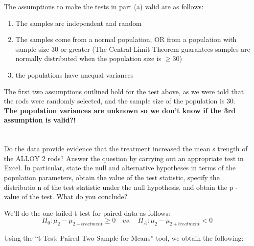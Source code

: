\documentclass[letterpaper]{article}
\begin{document}
The assumptions to make the tests in part (a) valid are as follows:
\begin{enumerate}
 \item The samples are independent and random
 \item The samples come from a normal population,
       OR from a population with sample size 30 or greater
       (The Central Limit Theorem guarantees samples are normally distributed
       when the population size is $\geq 30$)
 \item the populations have unequal variances
\end{enumerate}

The first two assumptions outlined hold for the test above, as we were told that the
rods were randomly selected, and the sample size of the population is 30.
\textbf{The population variances are unknown so we don't know if the 3rd assumption is valid?!}

\section{}%

\subsection{}%
Do the data provide evidence that the treatment increased the mean s trength of
the ALLOY 2  rods? Answer the question by carrying out an appropriate test in
Excel.  In particular, state  the null  and alternative hypotheses in terms of
the population parameters, obtain the value of the test  statistic,  specify the
distributio n of the test statistic under the null hypothesis, and obtain the  p
- value of the test. What do you conclude?

We'll do the one-tailed t-test for paired data as follows:\\
$$H_0: \mu_2 - \mu_{2+treatment} \geq 0  \quad vs. \quad H_A: \mu_2 - \mu_{2+treatment} < 0 $$

Using the ``t-Test: Paired Two Sample for Means'' tool, we obtain the following:
\end{document}

